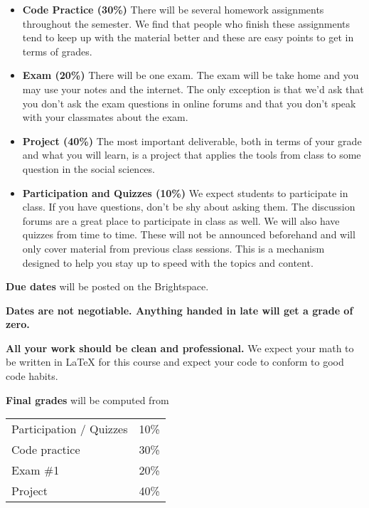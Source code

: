 \documentclass[12pt,pdftex,twoside,letterpaper]{exam}
\begin{document}
    \begin{itemize}
      \item {\bf Code Practice (30\%)} There will be several homework assignments throughout the
            semester. We find that people who finish these assignments tend to keep up
            with the material better and these are easy points to get in terms of grades.
      \item {\bf Exam (20\%)} There will be one exam. The exam will be take home and you may use
            your notes and the internet. The only exception is that we'd ask that you don't ask
            the exam questions in online forums and that you don't speak with your classmates about
            the exam.
      \item {\bf Project (40\%)} The most important deliverable, both in terms of your grade and
            what you will learn, is a project that applies the tools from class to some question
            in the social sciences.
      \item {\bf Participation and Quizzes (10\%)} We expect students to participate in class. If you have
            questions, don't be shy about asking them. The discussion forums are a great place to
            participate in class as well. We will also have quizzes from time to time. These will not be announced beforehand and will only cover material from previous class sessions. This is a mechanism designed to help you stay up to speed with the topics and content.
    \end{itemize}


    {\bf Due dates} will be posted on the Brightspace.

    {\bf Dates are not negotiable. Anything handed in late will get a grade of zero.}

    {\bf All your work should be clean and professional.} We expect your math to be written in
    LaTeX for this course and expect your code to conform to good code habits.

    {\bf Final grades\/} will be computed from

    \begin{center}
      \begin{tabular}{ll}
        Participation / Quizzes & 10\% \\
        Code practice & 30\% \\
        Exam \#1        & 20\% \\
        Project        & 40\% \\
      \end{tabular}
    \end{center}
\end{document}
